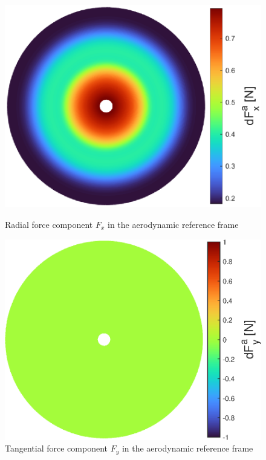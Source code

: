 {\begin{figure}[!htb]
    \centering
    \begin{minipage}{.49\textwidth}
      \centering
      \includegraphics[width=\textwidth]{Figures/comp_method/sim_B/dFx_a.eps}
      \caption{Radial force component $F_x$ in the aerodynamic reference frame}
      \label{fig:radial_force_paper}
    \end{minipage}%
    \hfill
    \begin{minipage}{.49\textwidth}
      \centering
      \includegraphics[width=\textwidth]{Figures/comp_method/sim_B/dFy_a.eps}
      \caption{Tangential force component $F_y$ in the aerodynamic reference frame}
      \label{fig:tangential_force_paper}
    \end{minipage}
\end{figure}

}

